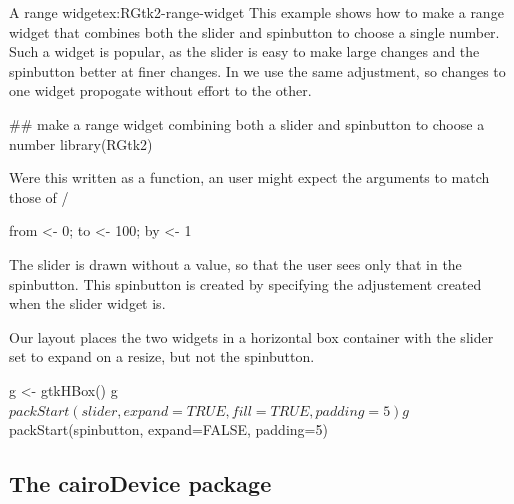 \begin{example}{A range widget}{ex:RGtk2-range-widget}
This example shows how to make a range widget that combines both the slider and spinbutton to choose a single number. Such a widget is popular, as the slider is easy to make large changes and the spinbutton better at finer changes. In \GTK\/ we use the same adjustment, so changes to one widget propogate without effort to the other.

\begin{Schunk}
\begin{Sinput}
 ## make a range widget combining both a slider and spinbutton to choose a number
 library(RGtk2)
\end{Sinput}
\end{Schunk}

Were this written as a function, an \R\/ user might expect the
arguments to match those of /
\begin{Schunk}
\begin{Sinput}
 from <- 0; to <- 100; by <- 1
\end{Sinput}
\end{Schunk}

The slider is drawn without a value, so that the user sees only that
in the spinbutton. This spinbutton is created by specifying the
adjustement created when the slider widget is.
\begin{Schunk}
\end{Schunk}
Our layout places the two widgets in a horizontal box container with
the slider set to expand on a resize, but not the spinbutton.
\begin{Schunk}
\begin{Sinput}
 g <- gtkHBox()
 g$packStart(slider, expand=TRUE, fill=TRUE, padding=5)
 g$packStart(spinbutton, expand=FALSE, padding=5)
\end{Sinput}
\end{Schunk}


\end{example}

\subsection{The cairoDevice package}
\label{sec:cairodevice-package}

